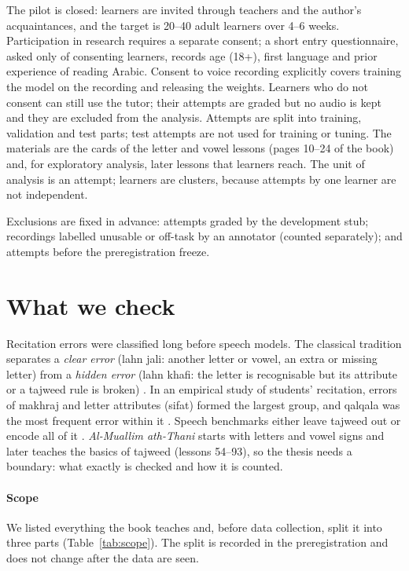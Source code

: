 The pilot is closed: learners are invited through teachers and the author's acquaintances, and the target is
20--40 adult learners over 4--6 weeks. Participation in research requires a separate consent; a short entry
questionnaire, asked only of consenting learners, records age (18+), first language and prior experience of
reading Arabic. Consent to voice recording explicitly covers training the model on the recording and
releasing the weights. Learners who do not consent can still use the tutor; their attempts are graded but no audio
is kept and they are excluded from the analysis. Attempts are split into training, validation and test parts; test attempts are not used for training or tuning. The materials are the cards of the letter and vowel lessons
(pages 10--24 of the book) and, for exploratory analysis, later lessons that learners reach. The unit of
analysis is an attempt; learners are clusters, because attempts by one learner are not independent.

Exclusions are fixed in advance: attempts graded by the development stub; recordings labelled unusable or
off-task by an annotator (counted separately); and attempts before the preregistration freeze.

\section{What we check}\label{sec:method-scope}

Recitation errors were classified long before speech models. The classical tradition separates a
\emph{clear error} (lahn jali: another letter or vowel, an extra or missing letter) from a \emph{hidden error}
(lahn khafi: the letter is recognisable but its attribute or a tajweed rule is broken) \cite{SRC-153}. In an
empirical study of students' recitation, errors of makhraj and letter attributes (sifat) formed the largest
group, and qalqala was the most frequent error within it \cite{SRC-152}. Speech benchmarks either leave tajweed
out \cite{SRC-004} or encode all of it \cite{SRC-002}. \emph{Al-Muallim ath-Thani} starts with letters and
vowel signs and later teaches the basics of tajweed (lessons 54--93), so the thesis needs a boundary: what
exactly is checked and how it is counted.

\paragraph{Scope} We listed everything the book teaches and, before data collection, split it into three parts
(Table~\ref{tab:scope}). The split is recorded in the preregistration and does not change after the data are
seen.

